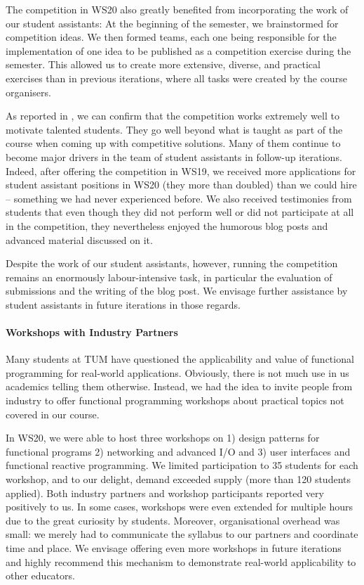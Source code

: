 The competition in WS20 also greatly benefited from incorporating the work of our student assistants:
At the beginning of the semester,
we brainstormed for competition ideas.
We then formed teams, each one being responsible for the
implementation of one idea to be published as a competition exercise during the semester.
This allowed us to create more extensive, diverse,
and practical exercises than in previous iterations,
where all tasks were created by the course organisers.

As reported in \cite{next_1100},
we can confirm that the competition works extremely well to motivate talented students.
They go well beyond what is taught as part of the course when coming up with competitive solutions.
Many of them continue to become major drivers in
the team of student assistants in follow-up iterations.
Indeed, after offering the competition in WS19,
we received more applications for student assistant positions in WS20 (they more than doubled) than we could hire -- something we had never experienced before.
We also received testimonies from students that even though they did not perform well or did not participate at all in the competition,
they nevertheless enjoyed the humorous blog posts and advanced material discussed on it.

Despite the work of our student assistants,
however,
running the competition remains an enormously labour-intensive task,
in particular the evaluation of submissions and
the writing of the blog post.
We envisage further assistance by student assistants in future iterations in those regards.

\paragraph{Workshops with Industry Partners}
Many students at TUM have questioned the applicability and value of functional programming for real-world applications.
Obviously, there is not much use in us academics telling
them otherwise.
Instead, we had the idea to invite people from industry
to offer functional programming workshops about
practical topics not covered in our course.

In WS20,
we were able to host three workshops on 1) design patterns
for functional programs 2) networking and advanced I/O and 3) user interfaces and functional reactive programming.
We limited participation to 35 students for each workshop,
and to our delight, demand exceeded supply (more than 120 students applied).
Both industry partners and workshop participants
reported very positively to us.
In some cases,
workshops were even extended for multiple hours due to the great curiosity by students.
Moreover, organisational overhead was small:
we merely had to communicate the syllabus to our partners and coordinate time and place.
We envisage offering even more workshops in future iterations and highly recommend this mechanism to demonstrate real-world applicability to other educators.


